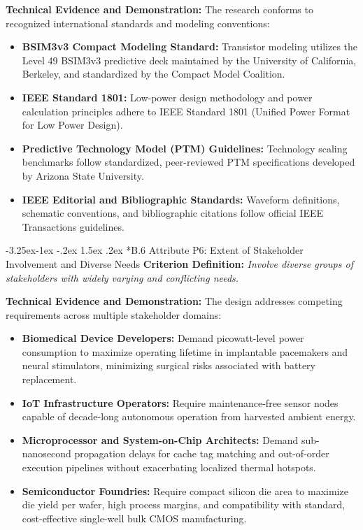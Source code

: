 \documentclass[12pt,a4paper,oneside]{report}
\makeatletter
\renewcommand\subsection{\@startsection{subsection}{2}{\z@}%
                                     {-3.25ex\@plus -1ex \@minus -.2ex}%
                                     {1.5ex \@plus .2ex}%
                                     {\normalfont\normalsize\bfseries\itshape}}
\makeatother
\begin{document}
\noindent\textbf{Technical Evidence and Demonstration:}
The research conforms to recognized international standards and modeling conventions:
\begin{itemize}
\item \textbf{BSIM3v3 Compact Modeling Standard:} Transistor modeling utilizes the Level 49 BSIM3v3 predictive deck maintained by the University of California, Berkeley, and standardized by the Compact Model Coalition.
\item \textbf{IEEE Standard 1801:} Low-power design methodology and power calculation principles adhere to IEEE Standard 1801 (Unified Power Format for Low Power Design).
\item \textbf{Predictive Technology Model (PTM) Guidelines:} Technology scaling benchmarks follow standardized, peer-reviewed PTM specifications developed by Arizona State University.
\item \textbf{IEEE Editorial and Bibliographic Standards:} Waveform definitions, schematic conventions, and bibliographic citations follow official IEEE Transactions guidelines.
\end{itemize}

\subsection*{B.6 Attribute P6: Extent of Stakeholder Involvement and Diverse Needs}
\textbf{Criterion Definition:} \textit{Involve diverse groups of stakeholders with widely varying and conflicting needs.}

\noindent\textbf{Technical Evidence and Demonstration:}
The design addresses competing requirements across multiple stakeholder domains:
\begin{itemize}
\item \textbf{Biomedical Device Developers:} Demand picowatt-level power consumption to maximize operating lifetime in implantable pacemakers and neural stimulators, minimizing surgical risks associated with battery replacement.
\item \textbf{IoT Infrastructure Operators:} Require maintenance-free sensor nodes capable of decade-long autonomous operation from harvested ambient energy.
\item \textbf{Microprocessor and System-on-Chip Architects:} Demand sub-nanosecond propagation delays for cache tag matching and out-of-order execution pipelines without exacerbating localized thermal hotspots.
\item \textbf{Semiconductor Foundries:} Require compact silicon die area to maximize die yield per wafer, high process margins, and compatibility with standard, cost-effective single-well bulk CMOS manufacturing.
\end{itemize}
\end{document}
